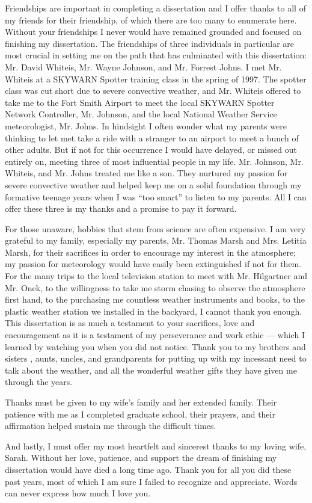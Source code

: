 Friendships are important in completing a dissertation and I offer thanks to all of my friends for their friendship, of which there are too many to enumerate here.
Without your friendships I never would have remained grounded and focused on finishing my dissertation.
The friendships of three individuals in particular are most crucial in setting me on the path that has culminated with this dissertation: Mr. David Whiteis, Mr. Wayne Johnson, and Mr. Forrest Johns.
I met Mr. Whiteis at a SKYWARN Spotter training class in the spring of 1997.
The spotter class was cut short due to severe convective weather, and Mr. Whiteis offered to take me to the Fort Smith Airport to meet the local SKYWARN Spotter Network Controller, Mr. Johnson, and the local National Weather Service meteorologist, Mr. Johns.
In hindsight I often wonder what my parents were thinking to let met take a ride with a stranger to an airport to meet a bunch of other adults.
But if not for this occurrence I would have delayed, or missed out entirely on, meeting three of most influential people in my life.
Mr. Johnson, Mr. Whiteis, and Mr. Johns treated me like a son.
They nurtured my passion for severe convective weather and helped keep me on a solid foundation through my formative teenage years when I was ``too smart'' to listen to my parents.
All I can offer these three is my thanks and a promise to pay it forward.


For those unaware, hobbies that stem from science are often expensive.
I am very grateful to my family, especially my parents, Mr. Thomas Marsh and Mrs. Letitia Marsh, for their sacrifices in order to encourage my interest in the atmosphere; my passion for meteorology would have easily been extinguished if not for them.
For the many trips to the local television station to meet with Mr. Hilgartner and Mr. Onek, to the willingness to take me storm chasing to observe the atmosphere first hand, to the purchasing me countless weather instruments and books, to the plastic weather station we installed in the backyard, I cannot thank you enough.
This dissertation is as much a testament to your sacrifices, love and encouragement as it is a testament of my perseverance and work ethic --- which I learned by watching you when you did not notice.
Thank you to my brothers and sisters , aunts, uncles, and grandparents for putting up with my incessant need to talk about the weather, and all the wonderful weather gifts they have given me through the years.


Thanks must be given to my wife's family and her extended family.
Their patience with me as I completed graduate school, their prayers, and their affirmation helped sustain me through the difficult times.


And lastly, I must offer my most heartfelt and sincerest thanks to my loving wife, Sarah.
Without her love, patience, and support the dream of finishing my dissertation would have died a long time ago.
Thank you for all you did these past years, most of which I am sure I failed to recognize and appreciate.
Words can never express how much I love you.
